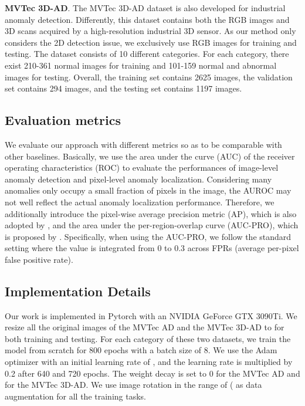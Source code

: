 \documentclass[5p, twocolumn]{elsarticle}[draft]
\begin{document}
\textbf{MVTec 3D-AD}. The MVTec 3D-AD dataset \cite{bergmann2021mvtec} is also developed for industrial anomaly detection. Differently, this dataset contains both the RGB images and 3D scans acquired by a high-resolution industrial 3D sensor. As our method only considers the 2D detection issue, we exclusively use RGB images for training and testing. The dataset consists of 10 different categories. For each category, there exist 210-361 normal images for training and 101-159 normal and abnormal images for testing. Overall, the training set contains 2625 images, the validation set contains 294 images, and the testing set contains 1197 images. 

\subsection{Evaluation metrics}
We evaluate our approach with different metrics so as to be comparable with other baselines. Basically, we use the area under the curve (AUC) of the receiver operating characteristics (ROC) to evaluate the performances of image-level anomaly detection and pixel-level anomaly localization. Considering many anomalies only occupy a small fraction of pixels in the image, the AUROC may not well reflect the actual anomaly localization performance. Therefore, we additionally introduce the pixel-wise average precision metric (AP), which is also adopted by \cite{zavrtanik2021draem}, and the area under the per-region-overlap curve (AUC-PRO), which is proposed by \cite{bergmann2020uninformed}. Specifically, when using the AUC-PRO, we follow the standard setting where the value is integrated from 0 to 0.3 across FPRs (average per-pixel false positive rate). 

\subsection{Implementation Details}
Our work is implemented in Pytorch with an NVIDIA GeForce GTX 3090Ti. We resize all the original images of the MVTec AD and the MVTec 3D-AD to  for both training and testing. For each category of these two datasets, we train the model from scratch for 800 epochs with a batch size of 8. We use the Adam optimizer with an initial learning rate of , and the learning rate is multiplied by 0.2 after 640 and 720 epochs. The weight decay is set to 0 for the MVTec AD and  for the MVTec 3D-AD. We use image rotation in the range of ( as data augmentation for all the training tasks.
\end{document}
